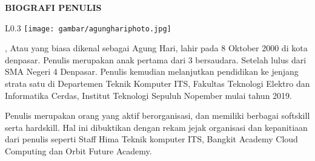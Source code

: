 \begin{center}
  \Large
  \textbf{BIOGRAFI PENULIS}
\end{center}


\vspace{2ex}

\begin{wrapfigure}{L}{0.3\textwidth}
  \centering
  \vspace{-3ex}
  \texttt{[image: gambar/agunghariphoto.jpg]}
  \vspace{-4ex}
\end{wrapfigure}

\name{}, Atau yang biasa dikenal sebagai Agung Hari, lahir pada 8 Oktober 2000 di kota denpasar. Penulis merupakan anak pertama dari 3 bersaudara. Setelah lulus dari SMA Negeri 4 Denpasar. Penulis kemudian melanjutkan pendidikan ke jenjang strata satu di Departemen Teknik Komputer ITS, Fakultas Teknologi Elektro dan Informatika Cerdas, Institut Teknologi Sepuluh Nopember mulai tahun 2019.

Penulis merupakan orang yang aktif berorganisasi, dan memiliki berbagai softskill serta hardskill. Hal ini dibuktikan dengan rekam jejak organisasi dan kepanitiaan dari penulis seperti Staff Hima Teknik komputer ITS, Bangkit Academy Cloud Computing dan Orbit Future Academy.